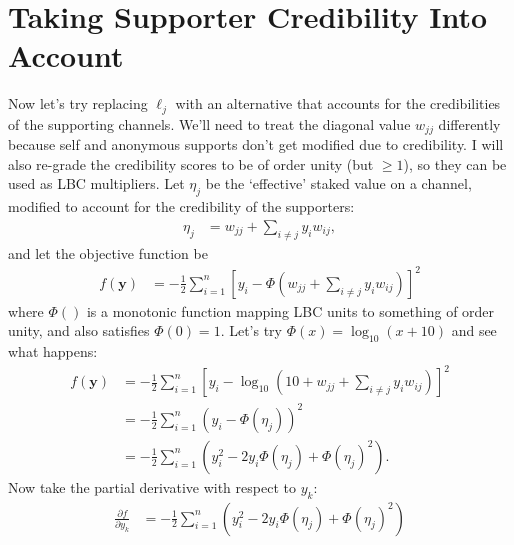 \documentclass[a4paper, 12pt]{article}
\begin{document}
\section{Taking Supporter Credibility Into Account}
Now let's try replacing $\ell_j$ with an alternative that accounts for the
credibilities of the supporting channels. We'll need to treat the diagonal
value $w_{jj}$ differently because self and anonymous supports don't get
modified due to credibility. I will also re-grade the credibility scores
to be of order unity (but $\geq 1$), so they can be used as LBC multipliers.
Let $\eta_j$ be the `effective' staked value on a channel, modified to account
for the credibility of the supporters:
\begin{align}
\eta_j &= w_{jj} + \sum_{i \neq j} y_i w_{ij},
\end{align}
and let the objective function be
\begin{align}
f(\boldsymbol{y}) &= -\frac{1}{2}\sum_{i=1}^n \left[
                            y_i - \Phi\left(w_{jj} + \sum_{i \neq j} y_i w_{ij}\right)
                        \right]^2
\end{align}
where $\Phi()$ is a monotonic function mapping LBC units to something of order
unity, and also satisfies $\Phi(0) = 1$. Let's try
$\Phi(x) = \log_{10}(x + 10)$ and see what happens:
\begin{align}
f(\boldsymbol{y}) &= -\frac{1}{2}\sum_{i=1}^n \left[
                            y_i - \log_{10}\left(10 + w_{jj} + \sum_{i \neq j} y_i w_{ij}\right)
                        \right]^2 \\
    &= -\frac{1}{2}\sum_{i=1}^n\left(y_i - \Phi(\eta_j)\right)^2 \\
    &= -\frac{1}{2}\sum_{i=1}^n\left(y_i^2 - 2y_i\Phi(\eta_j) + \Phi(\eta_j)^2\right).
\end{align}
Now take the partial derivative with respect to $y_k$:
\begin{align}
\frac{\partial f}{\partial y_k}
    &= -\frac{1}{2}\sum_{i=1}^n\left(y_i^2 - 2y_i\Phi(\eta_j) + \Phi(\eta_j)^2\right)
\end{align}





\end{document}
